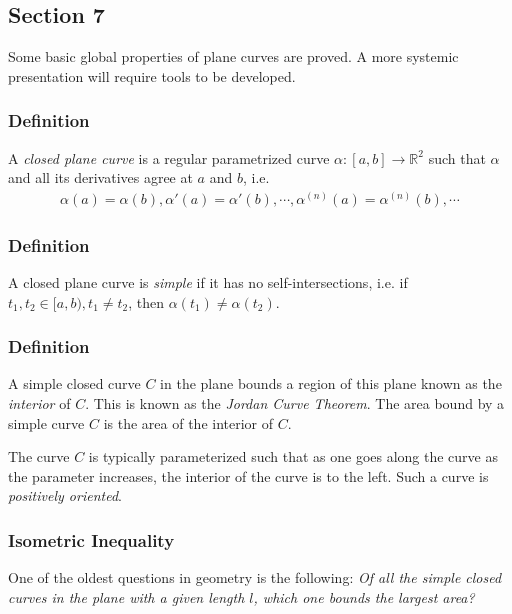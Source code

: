 \documentclass{article}
\newcommand{\R}{\mathbb{R}}
\begin{document}
	\subsection*{Section 7}
	Some basic global properties of plane curves are proved. A more systemic presentation will require tools to be developed.
	
	\subsubsection*{Definition}
	A \textit{closed plane curve} is a regular parametrized curve $\alpha: [a, b] \to \R^2$ such that $\alpha$ and all its derivatives agree at $a$ and $b$, i.e.
	\begin{gather*}
		\alpha(a) = \alpha(b), \alpha'(a) = \alpha'(b), \cdots, \alpha^{(n)}(a) = \alpha^{(n)}(b), \cdots
	\end{gather*}
	
	\subsubsection*{Definition}
	A closed plane curve is \textit{simple} if it has no self-intersections, i.e. if $t_1, t_2 \in [a, b), t_1 \neq t_2$, then $\alpha(t_1) \neq \alpha(t_2)$.
	
	\subsubsection*{Definition}
	A simple closed curve $C$ in the plane bounds a region of this plane known as the \textit{interior} of $C$. This is known as the \textit{Jordan Curve Theorem}. The area bound by a simple curve $C$ is the area of the interior of $C$.
	
	The curve $C$ is typically parameterized such that as one goes along the curve as the parameter increases, the interior of the curve is to the left. Such a curve is \textit{positively oriented}.
	
	\subsubsection*{Isometric Inequality}
	One of the oldest questions in geometry is the following: \textit{Of all the simple closed curves in the plane with a given length $l$, which one bounds the largest area?}
	
\end{document}
